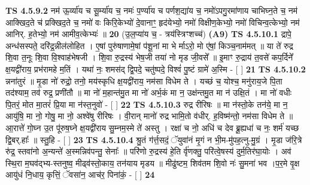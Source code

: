 \documentclass[17pt]{extarticle}
\begin{document}
                  \newline
                                \textbf{ TS 4.5.9.2} \newline
                  नम॑ ऊ॒र्व्या॑य च सू॒र्म्या॑य च॒ नमः॑ प॒र्ण्या॑य च पर्णश॒द्या॑य च॒ नमो॑ऽपगु॒रमा॑णाय चाभिघ्न॒ते च॒ नम॑ आक्खिद॒ते च॑ प्रक्खिद॒ते च॒ नमो॑ वः किरि॒केभ्यो॑ दे॒वानाꣳ॒॒ हृद॑येभ्यो॒ नमो॑ विक्षीण॒केभ्यो॒ नमो॑ विचिन्व॒त्केभ्यो॒ नम॑ आनिर्. ह॒तेभ्यो॒ नम॑ आमीव॒त्केभ्यः॑ ॥ \textbf{  20} \newline
                  \newline
                      (उ॒ल॒प्या॑य च॒ - त्रय॑स्त्रिꣳशच्च॑)  \textbf{(A9)} \newline \newline
                                        \textbf{ TS 4.5.10.1} \newline
                  द्रापे॒ अन्ध॑सस्पते॒ दरि॑द्र॒न्नील॑लोहित । ए॒षां पुरु॑षाणामे॒षां प॑शू॒नां मा भे र्माऽरो॒ मो ए॑षां॒ किञ्च॒नाम॑मत् ॥ या ते॑ रुद्र शि॒वा त॒नूः शि॒वा वि॒श्वाह॑भेषजी । शि॒वा रु॒द्रस्य॑ भेष॒जी तया॑ नो मृड जी॒वसे᳚ ॥                                    इ॒माꣳ रु॒द्राय॑ त॒वसे॑ कप॒र्दिने᳚ क्ष॒यद्वी॑राय॒ प्रभ॑रामहे म॒तिं । यथा॑ नः॒ शमस॑द् द्वि॒पदे॒ चतु॑ष्पदे॒ विश्वं॑ पु॒ष्टं ग्रामे॑ अ॒स्मि - [  ] \textbf{  21} \newline
                  \newline
                                \textbf{ TS 4.5.10.2} \newline
                  न्नना॑तुरं ॥ मृ॒डा नो॑ रुद्रो॒ तनो॒ मय॑स्कृधि क्ष॒यद्वी॑राय॒ नम॑सा विधेम ते । यच्छं च॒ योश्च॒ मनु॑राय॒जे पि॒ता तद॑श्याम॒ तव॑ रुद्र॒ प्रणी॑तौ ॥ मा नो॑ म॒हान्त॑मु॒त मा नो॑ अर्भ॒कं मा न॒ उक्ष॑न्तमु॒त मा न॑ उक्षि॒तं । मा नो॑ वधीः पि॒तरं॒ मोत मा॒तरं॑ प्रि॒या मा न॑स्त॒नुवो॑ - [  ] \textbf{  22} \newline
                  \newline
                                \textbf{ TS 4.5.10.3} \newline
                  रुद्र रीरिषः ॥ मा न॑स्तो॒के तन॑ये॒ मा न॒ आयु॑षि॒ मा नो॒ गोषु॒ मा नो॒ अश्वे॑षु रीरिषः । वी॒रान् मानो॑ रुद्र भामि॒तो व॑धीर्. ह॒विष्म॑न्तो॒ नम॑सा विधेम ते ॥ आ॒रात्ते॑ गो॒घ्न उ॒त पू॑रुष॒घ्ने क्ष॒यद्वी॑राय सु॒म्नम॒स्मे ते॑ अस्तु । रक्षा॑ च नो॒ अधि॑ च देव ब्रू॒ह्यधा॑ च नः॒ शर्म॑ यच्छ द्वि॒बर्.हाः᳚ ॥ स्तु॒हि - [  ] \textbf{  23} \newline
                  \newline
                                \textbf{ TS 4.5.10.4} \newline
                  श्रु॒तं ग॑र्त्त॒सदं॒ ॅयुवा॑नं मृ॒गं न भी॒म-मु॑पह॒त्नु-मु॒ग्रं । मृ॒डा ज॑रि॒त्रे रु॑द्र॒ स्तवा॑नो अ॒न्यन्ते॑ अ॒स्मन्निव॑पन्तु॒ सेनाः᳚ ॥ परि॑णो रु॒द्रस्य॑ हे॒ति र्वृ॑णक्तु॒ परि॑त्वे॒षस्य॑ दुर्म॒तिर॑घा॒योः । अव॑ स्थि॒रा म॒घव॑द्भ्य-स्तनुष्व॒ मीढ्व॑स्तो॒काय॒ तन॑याय मृडय ॥ मीढु॑ष्टम॒ शिव॑तम शि॒वो नः॑ सु॒मना॑ भव ।प॒र॒मे वृ॒क्ष आयु॑धं नि॒धाय॒ कृत्तिं॒ ॅवसा॑न॒ आच॑र॒ पिना॑कं॒ - [  ] \textbf{  24} \newline
\end{document}
